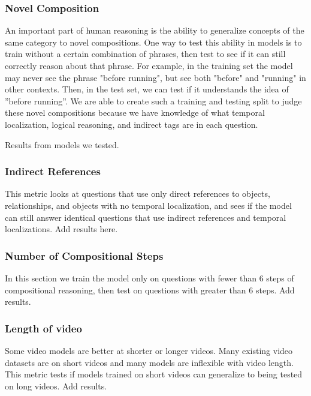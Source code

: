 \documentclass[10pt,twocolumn,letterpaper]{article}
\newcommand{\mgm}[1]{{\color{cyan}{mgm: #1}}}
\begin{document}
\subsubsection{Novel Composition}

An important part of human reasoning is the ability to generalize concepts of the same category to novel compositions. One way to test this ability in models is to train without a certain combination of phrases, then test to see if it can still correctly reason about that phrase. For example, in the training set the model may never see the phrase "before running", but see both "before" and "running" in other contexts. Then, in the test set, we can test if it understands the  idea  of  ”before running”.   We are able to create such a training and testing split to judge these  novel  compositions  because  we  have  knowledge  of what temporal localization, logical reasoning, and indirect tags are in each question.

Results from models we tested.

\subsubsection{Indirect References}

This metric looks at questions that use only direct references to objects, relationships, and objects with no temporal localization, and sees if the model can still answer identical questions that use indirect references and temporal localizations. Add results here.

\mgm{This will only be interesting if we fix indirects not affecting accuracy.}


\subsubsection{Number of Compositional Steps}

In this section we train the model only on questions with fewer than 6 steps of compositional reasoning, then test on questions with greater than 6 steps. Add results.

\subsubsection{Length of video}

Some video models are better at shorter or longer videos. Many existing video datasets are on short videos and many models are inflexible with video length. This metric tests if models trained on short videos can generalize to being tested on long videos. Add results.
\end{document}
